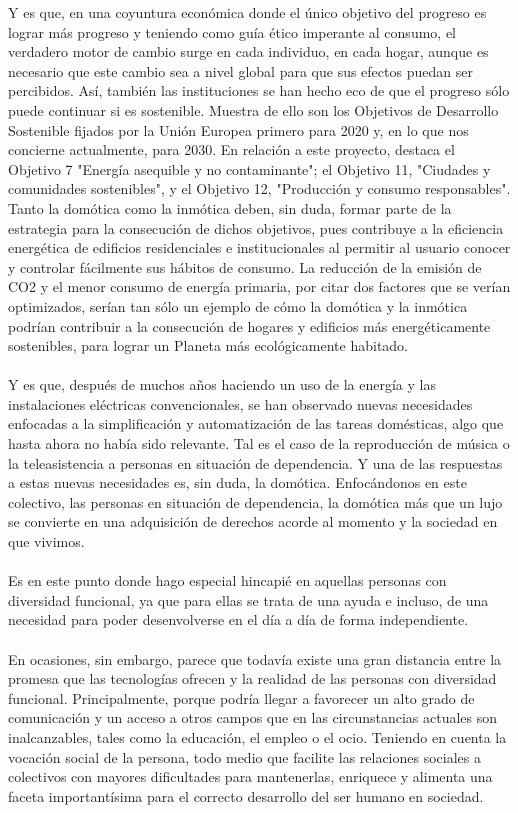 Y es que, en una coyuntura económica donde el único objetivo del progreso es lograr más progreso y teniendo como guía ético imperante al consumo, el verdadero motor de cambio surge en cada individuo, en cada hogar, aunque es necesario que este cambio sea a nivel global para que sus efectos puedan ser percibidos. Así, también las instituciones se han hecho eco de que el progreso sólo puede continuar si es sostenible. Muestra de ello son los Objetivos de Desarrollo Sostenible fijados por la Unión Europea primero para 2020 y, en lo que nos concierne actualmente, para 2030. En relación a este proyecto, destaca el Objetivo 7 "Energía asequible y no contaminante"; el Objetivo 11, "Ciudades y comunidades sostenibles", y el Objetivo 12, "Producción y consumo responsables". Tanto la domótica como la inmótica deben, sin duda, formar parte de la estrategia para la consecución de dichos objetivos, pues contribuye a la eficiencia energética de edificios residenciales e institucionales al permitir al usuario conocer y controlar fácilmente sus hábitos de consumo. La reducción de la emisión de CO2 y el menor consumo de energía primaria, por citar dos factores que se verían optimizados, serían tan sólo un ejemplo de cómo la domótica y la inmótica podrían contribuir a la consecución de hogares y edificios más energéticamente sostenibles, para lograr un Planeta más ecológicamente habitado.\\\\
Y es que, después de muchos años haciendo un uso de la energía y las instalaciones eléctricas convencionales, se han observado nuevas necesidades enfocadas a la simplificación y automatización de las tareas domésticas, algo que hasta ahora no había sido relevante. Tal es el caso de la reproducción de música o la teleasistencia a personas en situación de dependencia. Y una de las respuestas a estas nuevas necesidades es, sin duda, la domótica. Enfocándonos en este colectivo, las personas en situación de dependencia, la domótica más que un lujo se convierte en una adquisición de derechos acorde al momento y la sociedad en que vivimos. \\\\
Es en este punto donde hago especial hincapié en aquellas personas con diversidad funcional, ya que para ellas se trata de una ayuda e incluso, de una necesidad para poder desenvolverse en el día a día de forma independiente. \\\\
En ocasiones, sin embargo, parece que todavía existe una gran distancia entre la promesa que las tecnologías ofrecen y la realidad de las personas con diversidad funcional. Principalmente, porque podría llegar a favorecer un alto grado de comunicación y un acceso a otros campos que en las circunstancias actuales son inalcanzables, tales como la educación, el empleo o el ocio. Teniendo en cuenta la vocación social de la persona, todo medio que facilite las relaciones sociales a colectivos con mayores dificultades para mantenerlas, enriquece y alimenta una faceta importantísima para el correcto desarrollo del ser humano en sociedad. \\\\
